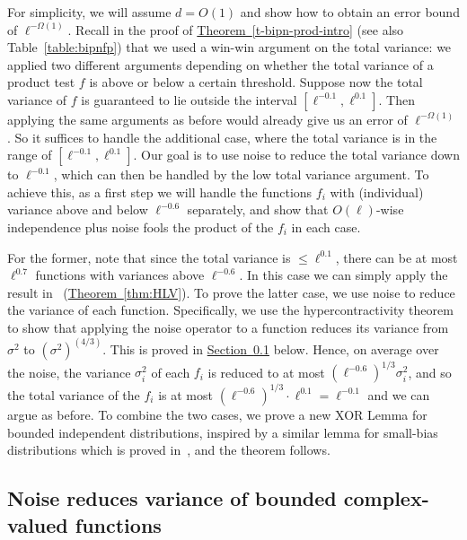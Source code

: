 \documentclass[11pt]{article}
\numberwithin{equation}{section}
\theoremstyle{definition}
\theoremstyle{plain}
\newcommand{\expref}[2]{\hyperref[#2]{#1~\ref{#2}}}
\def\Blocklength{\ell}
\begin{document}
  For simplicity, we will assume $d = O(1)$ and show how to obtain an error bound of $\Blocklength^{-\Omega(1)}$.
  Recall in the proof of \expref{Theorem}{t-bipn-prod-intro} (see also Table~\ref{table:bipnfp}) that we used a win-win argument on the total variance: we applied two different arguments depending on whether the total variance of a product test $f$ is above or below a certain threshold.
  Suppose now the total variance of $f$ is guaranteed to lie outside the interval $[\Blocklength^{-0.1}, \Blocklength^{0.1}]$.
  Then applying the same arguments as before would already give us an error of $\Blocklength^{-\Omega(1)}$.
  So it suffices to handle the additional case, where the total variance is in the range of $[\Blocklength^{-0.1}, \Blocklength^{0.1}]$.
	Our goal is to use noise to reduce the total variance down to $\Blocklength^{-0.1}$, which can then be handled by the low total variance argument.
  To achieve this, as a first step we will handle the functions $f_i$ with (individual) variance above and below $\Blocklength^{-0.6}$ separately, and show that $O(\Blocklength)$-wise independence plus noise fools the product of the $f_i$ in each case.

  For the former, note that since the total variance is $\le \Blocklength^{0.1}$, there can be at most $\Blocklength^{0.7}$ functions with variances above $\Blocklength^{-0.6}$.
  In this case we can simply apply the result in~\cite{HaramatyLV-bipnfp} (\expref{Theorem}{thm:HLV}).
  To prove the latter case, we use noise to reduce the variance of each function.
  Specifically, we use the hypercontractivity theorem to show that applying the noise operator to a function reduces its variance from $\sigma^2$ to $(\sigma^2)^{(4/3)}$.
  This is proved in \expref{Section}{sec:noise-reduce-var} below.
	Hence, on average over the noise, the variance $\sigma_i^2$ of each $f_i$ is reduced to at most $(\Blocklength^{-0.6})^{1/3} \sigma_i^2$, and so the total variance of the $f_i$ is at most $(\Blocklength^{-0.6})^{1/3} \cdot \Blocklength^{0.1} = \Blocklength^{-0.1}$ and we can argue as before.
  To combine the two cases, we prove a new XOR Lemma for bounded independent distributions, inspired by a similar lemma for small-bias distributions which is proved in~\cite{GopalanMRTV12}, and the theorem follows.

  \subsection{Noise reduces variance of bounded complex-valued functions} \label{sec:noise-reduce-var}
\end{document}
